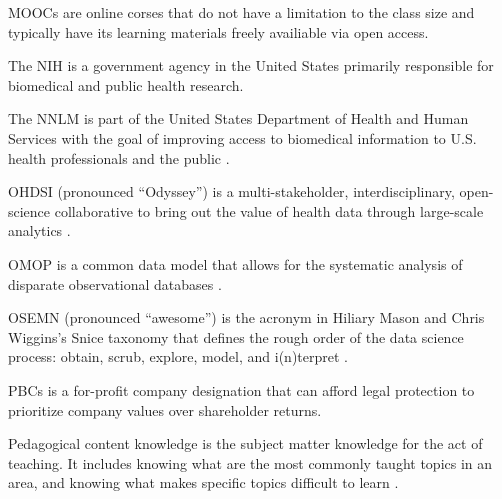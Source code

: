 \documentclass[../main.tex]{subfiles}
\begin{document}
  MOOCs are online corses that do not have a limitation to the class size and typically have its learning materials freely availiable via open access.



  The NIH is a government agency in the United States primarily responsible for biomedical and public health research.



  The NNLM is part of the United States Department of Health and Human Services
  with the goal of improving access to biomedical information to U.S. health professionals and the public
  \cite{nationallibraryofmedicineUsNNLM}.



  OHDSI (pronounced ``Odyssey'') is a multi-stakeholder, interdisciplinary, open-science collaborative
  to bring out the value of health data through large-scale analytics
  \cite{observationalhealthdatasciencesandinformaticsOHDSIObservationalHealth}.



  OMOP is a common data model that allows for the systematic analysis of disparate observational databases
  \cite{observationalhealthdatasciencesandinformaticsohdsiobservationalhealthOMOPCommonData}.



  OSEMN (pronounced ``awesome'') is the acronym in Hiliary Mason and Chris Wiggins's Snice taxonomy that defines
  the rough order of the data science process:
  obtain, scrub, explore, model, and i(n)terpret
  \cite{masonTaxonomyDataScience2010}.



  PBCs is a for-profit company designation that can afford legal protection
  to prioritize company values over shareholder returns.



  Pedagogical content knowledge is the subject matter knowledge for the act of teaching.
  It includes knowing what are the most commonly taught topics in an area,
  and knowing what makes specific topics difficult to learn
  \cite{shulmanThoseWhoUnderstand1986}.
\end{document}
